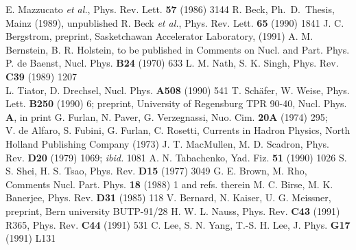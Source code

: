 \begin{thebibliography}{99}
 E. Mazzucato {\em et al.},
              Phys. Rev. Lett. {\bf 57} (1986) 3144
 R. Beck, Ph.~D.~Thesis, Mainz (1989), unpublished	      
 R. Beck {\em et al.}, Phys. Rev. Lett. {\bf 65} (1990) 1841
 J. C. Bergstrom, preprint, Sasketchawan Accelerator 
              Laboratory, (1991)
 A. M. Bernstein, B. R. Holstein, to be published in 
              Comments on Nucl. and Part. Phys.  	       
 P. de Baenst, Nucl. Phys. {\bf B24} (1970) 633
 L. M. Nath, S. K. Singh, Phys. Rev. {\bf C39} (1989) 1207 \\
              L. Tiator, D. Drechsel, Nucl. Phys. {\bf A508} (1990) 541
  T. Sch\"afer, W. Weise, Phys. Lett. {\bf B250} (1990) 6;
              preprint, University of Regensburg TPR 90-40, Nucl. Phys.
	      {\bf A}, in print 	      
 G. Furlan, N. Paver, G. Verzegnassi, Nuo. Cim. {\bf 20A}
              (1974) 295;\\
	      V. de Alfaro, S. Fubini, G. Furlan, C. Rosetti, Currents in
	      Hadron Physics, North Holland Publishing Company (1973)
 J. T. MacMullen, M. D. Scadron, Phys. Rev. {\bf D20} (1979)
              1069; {\em ibid.} 1081  	      	        
 A. N. Tabachenko, Yad. Fiz. {\bf 51} (1990) 1026 	      
 S. S. Shei, H. S. Tsao, Phys. Rev. {\bf D15} (1977) 3049 	      
  G. E. Brown, M. Rho, Comments Nucl. Part. Phys. {\bf 18} (1988)
              1 and refs. therein       
 M. C. Birse, M. K. Banerjee, Phys. Rev. {\bf D31} (1985) 118
 V. Bernard, N. Kaiser, U. G. Meissner, preprint,
              Bern university BUTP-91/28
 H. W. L. Nauss, Phys. Rev. {\bf C43} (1991) R365, Phys. Rev.
              {\bf C44} (1991) 531 	      
 C. Lee, S. N. Yang, T.-S. H. Lee, J. Phys. {\bf G17} (1991)
              L131	      
\end{thebibliography}


